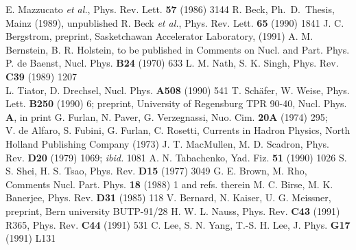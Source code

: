 \begin{thebibliography}{99}
 E. Mazzucato {\em et al.},
              Phys. Rev. Lett. {\bf 57} (1986) 3144
 R. Beck, Ph.~D.~Thesis, Mainz (1989), unpublished	      
 R. Beck {\em et al.}, Phys. Rev. Lett. {\bf 65} (1990) 1841
 J. C. Bergstrom, preprint, Sasketchawan Accelerator 
              Laboratory, (1991)
 A. M. Bernstein, B. R. Holstein, to be published in 
              Comments on Nucl. and Part. Phys.  	       
 P. de Baenst, Nucl. Phys. {\bf B24} (1970) 633
 L. M. Nath, S. K. Singh, Phys. Rev. {\bf C39} (1989) 1207 \\
              L. Tiator, D. Drechsel, Nucl. Phys. {\bf A508} (1990) 541
  T. Sch\"afer, W. Weise, Phys. Lett. {\bf B250} (1990) 6;
              preprint, University of Regensburg TPR 90-40, Nucl. Phys.
	      {\bf A}, in print 	      
 G. Furlan, N. Paver, G. Verzegnassi, Nuo. Cim. {\bf 20A}
              (1974) 295;\\
	      V. de Alfaro, S. Fubini, G. Furlan, C. Rosetti, Currents in
	      Hadron Physics, North Holland Publishing Company (1973)
 J. T. MacMullen, M. D. Scadron, Phys. Rev. {\bf D20} (1979)
              1069; {\em ibid.} 1081  	      	        
 A. N. Tabachenko, Yad. Fiz. {\bf 51} (1990) 1026 	      
 S. S. Shei, H. S. Tsao, Phys. Rev. {\bf D15} (1977) 3049 	      
  G. E. Brown, M. Rho, Comments Nucl. Part. Phys. {\bf 18} (1988)
              1 and refs. therein       
 M. C. Birse, M. K. Banerjee, Phys. Rev. {\bf D31} (1985) 118
 V. Bernard, N. Kaiser, U. G. Meissner, preprint,
              Bern university BUTP-91/28
 H. W. L. Nauss, Phys. Rev. {\bf C43} (1991) R365, Phys. Rev.
              {\bf C44} (1991) 531 	      
 C. Lee, S. N. Yang, T.-S. H. Lee, J. Phys. {\bf G17} (1991)
              L131	      
\end{thebibliography}


